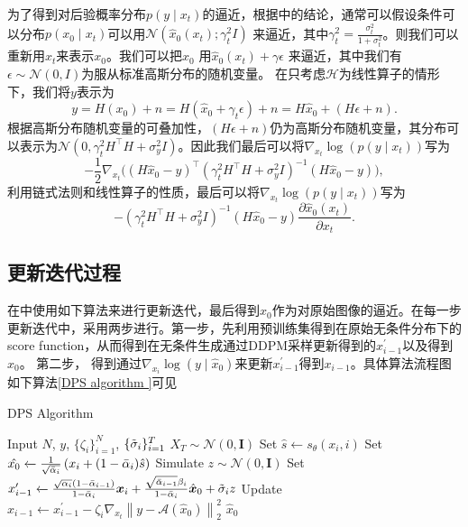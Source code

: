 为了得到对后验概率分布$p(y\mid x_t)$的逼近，根据\cite{pseudoinverse,ddrm}中的结论，通常可以假设条件可以分布$p(x_0\mid x_t)$可以用$\mathcal{N}(\hat{x}_0(x_t);\gamma_t^2 I)$
来逼近，其中$\gamma_t^2 = \frac{\sigma_t^2}{1+\sigma_t^2}$。则我们可以重新用$x_t$来表示$x_0$。我们可以把$x_0$ 用$\hat{x}_0(x_t) + \gamma \epsilon$ 来逼近，其中我们有$\epsilon\sim \mathcal{N}(0,I)$为服从标准高斯分布的随机变量。 在只考虑$\mathcal{H}$为线性算子的情形下，我们将$y$表示为
\begin{equation}
    y=H(x_0)+n = H(\hat{x}_0+\gamma_t \epsilon)+n = H\hat{x}_0 + (H\epsilon+n).
\end{equation}
根据高斯分布随机变量的可叠加性，$(H\epsilon+n)$仍为高斯分布随机变量，其分布可以表示为$\mathcal{N}(0,\gamma_t^2 H^{\top}H + \sigma_y^2 I)$。因此我们最后可以将$\nabla_{x_t}\log(p(y\mid x_t))$写为
\begin{equation}
  -\frac{1}{2} \nabla_{x_t} \bigg((H\hat{x}_0-y)^{\top}\left(\gamma_t^2 H^{\top}H + \sigma_y^2 I\right)^{-1}(H\hat{x}_0-y)\bigg),
\end{equation}
利用链式法则和线性算子的性质，最后可以将$\nabla_{x_t}\log(p(y\mid x_t))$写为
\begin{equation}
    -\left(\gamma_t^2 H^{\top}H + \sigma_y^2 I\right)^{-1}(H\hat{x}_0-y)\frac{\partial \hat{x}_0(x_t)}{\partial x_t}.
\end{equation}

\subsection{更新迭代过程}
在\cite{Inverse}中使用如下算法来进行更新迭代，最后得到$\hat{x}_0$作为对原始图像的逼近。在每一步更新迭代中，采用两步进行。第一步，先利用预训练集得到在原始无条件分布下的score function，从而得到在无条件生成通过DDPM采样更新得到的$x_{i-1}^{\prime}$以及得到$\hat{x}_0$。 第二步， 得到通过$\nabla_{x_i}\log(y\mid \hat{x}_0)$来更新$x_{i-1}^{\prime}$得到$x_{i-1}$。具体算法流程图如下算法\ref{DPS algorithm }可见
\begin{breakablealgorithm}
\caption{DPS Algorithm }
\label{DPS algorithm }
    \begin{algorithmic}[1]
   \REQUIRE Input $N$, $y$, $\{\zeta_i\}_{i=1}^{N}$, $\{\Tilde{\sigma}_i\}_{i=1}^{T}$
   \STATE $X_{T}\sim \mathcal{N}(0,\boldsymbol{I})$
   \STATE Set $\hat{s}\xleftarrow{} s_{\theta}(x_i,i)$
   \STATE Set $\hat{x_0} \xleftarrow{} \frac{1}{\sqrt{\Bar{\alpha}_i}}\left(x_i+(1-\Bar{\alpha}_i)\hat{s}\right)$
   \STATE Simulate $z\sim \mathcal{N}(0,\boldsymbol{I})$
   \STATE Set $x^{\prime}_{i-1}\xleftarrow{} \frac{\sqrt{\alpha_i}\left(1-\bar{\alpha}_{i-1}\right)}{1-\bar{\alpha}_i} \boldsymbol{x}_i+\frac{\sqrt{\bar{\alpha}_{i-1}} \beta_i}{1-\bar{\alpha}_i} \hat{\boldsymbol{x}}_0+\Tilde{\sigma}_i {z} $
   \STATE Update $x_{i-1}\xleftarrow{} {x}_{i-1}^{\prime}-\zeta_i \nabla_{{x}_t}\left\|{y}-\mathcal{A}\left(\hat{{x}}_0\right)\right\|_2^2 $
   \ENDFOR
   \RETURN $\hat{x}_0$ 
    \end{algorithmic}
\end{breakablealgorithm}      

